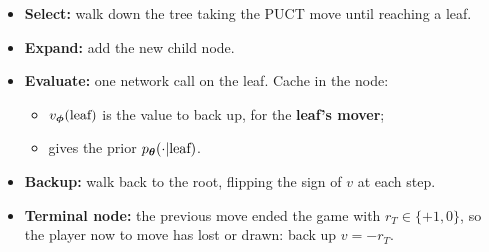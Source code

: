\begin{frame}
\begin{center}
    \end{center}
    \vspace{-0.3cm}
    \small
    \pause
    \begin{itemize}
        \item \textbf{Select:} walk down the tree taking the PUCT move until reaching a leaf.
        \item \textbf{Expand:} add the new child node.
        \item \textbf{Evaluate:} one network call on the leaf. Cache in the node:
        \begin{itemize}
            \small
            \item {} $v_{\boldsymbol{\phi}}(\text{leaf})$ is the value to back up, for the \textbf{leaf's mover};
            \item {} gives the prior $p_{\boldsymbol{\theta}}(\cdot|\text{leaf})$.
        \end{itemize}
        \item \textbf{Backup:} walk back to the root, flipping the sign of $v$ at each step.
        \pause
        \item \textbf{Terminal node:} the previous move ended the game with $r_T \in \{+1, 0\}$,
        so the player now to move has lost or drawn: back up $v = -r_T$.
    \end{itemize}
\end{frame}


